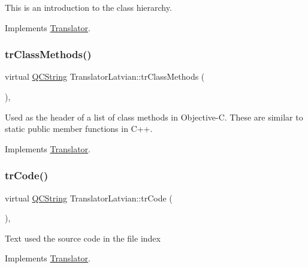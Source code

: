 This is an introduction to the class hierarchy. 

Implements \mbox{\hyperlink{class_translator}{Translator}}.

\mbox{\label{class_translator_latvian_ab5588d92b34793b3647b5c1324baf1b0}} 
\subsubsection{\texorpdfstring{trClassMethods()}{trClassMethods()}}
{\footnotesize\ttfamily virtual \mbox{\hyperlink{class_q_c_string}{Q\+C\+String}} Translator\+Latvian\+::tr\+Class\+Methods (\begin{DoxyParamCaption}{ }\end{DoxyParamCaption})\hspace{0.3cm}{\ttfamily [inline]}, {\ttfamily [virtual]}}

Used as the header of a list of class methods in Objective-\/C. These are similar to static public member functions in C++. 

Implements \mbox{\hyperlink{class_translator}{Translator}}.

\mbox{\label{class_translator_latvian_a5864e4602c0632be51b804e2cb136c7b}} 
\subsubsection{\texorpdfstring{trCode()}{trCode()}}
{\footnotesize\ttfamily virtual \mbox{\hyperlink{class_q_c_string}{Q\+C\+String}} Translator\+Latvian\+::tr\+Code (\begin{DoxyParamCaption}{ }\end{DoxyParamCaption})\hspace{0.3cm}{\ttfamily [inline]}, {\ttfamily [virtual]}}

Text used the source code in the file index 

Implements \mbox{\hyperlink{class_translator}{Translator}}.

\mbox{\label{class_translator_latvian_af21edcad63ee5596f951a1eef0bdbaca}} 
